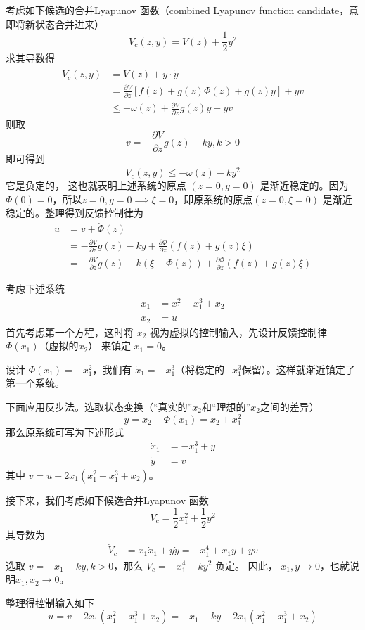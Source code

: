 考虑如下候选的合并Lyapunov 函数（combined Lyapunov function candidate，意即将新状态合并进来）
\[ V_c (z, y) = V (z) + \frac{1}{2} y^2 \]
求其导数得
\begin{align*}
  \dot{V}_c (z, y) & = \dot{V} (z) + y \cdot \dot{y}\\
  & = \frac{\partial V}{\partial z} [f (z) + g (z) \Phi (z) + g (z) y] + y 
  v\\
  & \leq - \omega (z) + \frac{\partial V}{\partial z} g (z) y + y  v
\end{align*}
则取 \[v = - \frac{\partial V}{\partial z} g (z) - k  y, k > 0\]
即可得到\[\dot{V}_c (z, y) \leq - \omega (z) - k  y^2\]
它是负定的，
这也就表明上述系统的原点 $(z = 0, y = 0)$ 是渐近稳定的。因为
$\Phi (0) = 0$，所以$z = 0, y = 0\implies \xi =0$，即原系统的原点$(z = 0, \xi = 0)$ 是渐近稳定的。整理得到反馈控制律为
\begin{align*}
  u & = v + \dot{\Phi}(z)\\
  & = - \frac{\partial V}{\partial z} g (z) - k  y + \frac{\partial
  \Phi}{\partial z} (f (z) + g (z) \xi)\\
  & = - \frac{\partial V}{\partial z} g (z) - k  (\xi - \Phi (z)) +
  \frac{\partial \Phi}{\partial z} (f (z) + g (z) \xi)
\end{align*}
\begin{example}[利用反步法进行非线性系统设计]
  考虑下述系统
  \begin{align*}
    \dot{x}_1 & = x^2_1 - x^3_1 + x_2\\
    \dot{x}_2 & = u
  \end{align*}
 首先考虑第一个方程，这时将 $x_2$ 视为虚拟的控制输入，先设计反馈控制律 $\Phi (x_1)$（虚拟的$x_2$） 来镇定 $x_1 = 0$。
  
  设计 $\Phi (x_1) = - x^2_1$，我们有 $\dot{x}_1 = - x^3_1$（将稳定的$- x^3_1$保留）。这样就渐近镇定了第一个系统。
  
  下面应用反步法。选取状态变换（“真实的”$x_2$和“理想的”$x_2$之间的差异）
  \[ y = x_2 - \Phi (x_1) = x_2 + x^2_1 \]
  那么原系统可写为下述形式
  \begin{align*}
    \dot{x}_1 & = - x^3_1 + y\\
    \dot{y}  & = v
  \end{align*}
  其中 $v = u + 2 x_1 (x^2_1 - x^3_1 + x_2)$。
  
  接下来，我们考虑如下候选合并Lyapunov 函数
  \[ V_c = \frac{1}{2} x^2_1 + \frac{1}{2} y^2 \]
  其导数为
  \begin{align*}
    \dot{V}_c & = x_1 \dot{x}_1 + y  \dot{y} = - x^4_1 + x_1 y + y  v
  \end{align*}
  选取 $v = - x_1 - k  y, k > 0$，那么 $\dot{V}_c = - x^4_1 - k  y^2$ 负定。
  因此， $x_1, y \rightarrow 0$，也就说明$x_1,x_2\rightarrow 0$。
  
  整理得控制输入如下
  \[ u = v - 2 x_1 (x^2_1 - x^3_1 + x_2) = - x_1 - k  y - 2 x_1 (x^2_1 - x^3_1
     + x_2) \]
\end{example}

